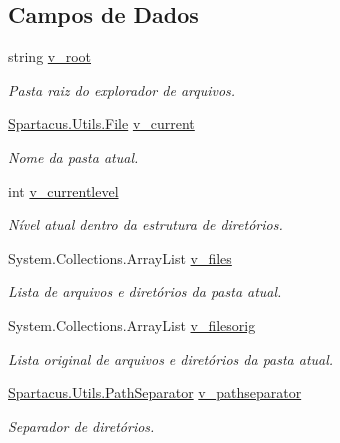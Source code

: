 \subsection*{Campos de Dados}
\begin{DoxyCompactItemize}
\item 
string \hyperlink{classSpartacus_1_1Utils_1_1FileExplorer_a398279cbdbce816d3c0d40b3dc02eb50}{v\+\_\+root}
\begin{DoxyCompactList}\small\item\em Pasta raiz do explorador de arquivos. \end{DoxyCompactList}\item 
\hyperlink{classSpartacus_1_1Utils_1_1File}{Spartacus.\+Utils.\+File} \hyperlink{classSpartacus_1_1Utils_1_1FileExplorer_a3b9d61aefae4f495fcc4709783671472}{v\+\_\+current}
\begin{DoxyCompactList}\small\item\em Nome da pasta atual. \end{DoxyCompactList}\item 
int \hyperlink{classSpartacus_1_1Utils_1_1FileExplorer_a3622a3fd986d0685ce13c5fe0ebb2c3b}{v\+\_\+currentlevel}
\begin{DoxyCompactList}\small\item\em Nível atual dentro da estrutura de diretórios. \end{DoxyCompactList}\item 
System.\+Collections.\+Array\+List \hyperlink{classSpartacus_1_1Utils_1_1FileExplorer_a94c423e8e9df914fb225b740e4829b11}{v\+\_\+files}
\begin{DoxyCompactList}\small\item\em Lista de arquivos e diretórios da pasta atual. \end{DoxyCompactList}\item 
System.\+Collections.\+Array\+List \hyperlink{classSpartacus_1_1Utils_1_1FileExplorer_adb13bc5f2309ceb21861d1a84caf7f98}{v\+\_\+filesorig}
\begin{DoxyCompactList}\small\item\em Lista original de arquivos e diretórios da pasta atual. \end{DoxyCompactList}\item 
\hyperlink{namespaceSpartacus_1_1Utils_a9ee24558a33d60b42674bae3eed2a094}{Spartacus.\+Utils.\+Path\+Separator} \hyperlink{classSpartacus_1_1Utils_1_1FileExplorer_a566ec72c60a0ddb78eec41f208237d61}{v\+\_\+pathseparator}
\begin{DoxyCompactList}\small\item\em Separador de diretórios. \end{DoxyCompactList}\item 

\end{DoxyCompactItemize}
